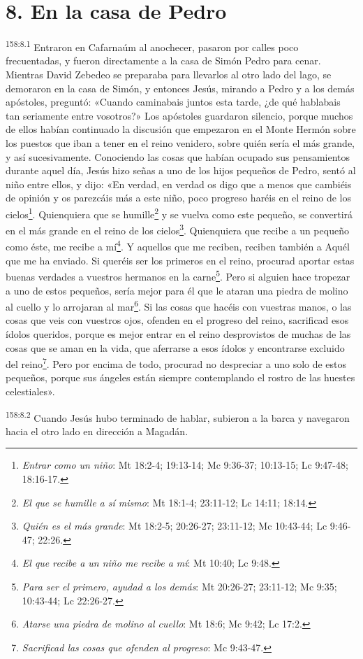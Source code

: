 \section*{8. En la casa de Pedro}
\par
\textsuperscript{158:8.1} Entraron en Cafarnaúm al anochecer, pasaron por calles poco frecuentadas, y fueron directamente a la casa de Simón Pedro para cenar. Mientras David Zebedeo se preparaba para llevarlos al otro lado del lago, se demoraron en la casa de Simón, y entonces Jesús, mirando a Pedro y a los demás apóstoles, preguntó: «Cuando caminabais juntos esta tarde, ¿de qué hablabais tan seriamente entre vosotros?» Los apóstoles guardaron silencio, porque muchos de ellos habían continuado la discusión que empezaron en el Monte Hermón sobre los puestos que iban a tener en el reino venidero, sobre quién sería el más grande, y así sucesivamente. Conociendo las cosas que habían ocupado sus pensamientos durante aquel día, Jesús hizo señas a uno de los hijos pequeños de Pedro, sentó al niño entre ellos, y dijo: «En verdad, en verdad os digo que a menos que cambiéis de opinión y os parezcáis más a este niño, poco progreso haréis en el reino de los cielos\footnote{\textit{Entrar como un niño}: Mt 18:2-4; 19:13-14; Mc 9:36-37; 10:13-15; Lc 9:47-48; 18:16-17.}. Quienquiera que se humille\footnote{\textit{El que se humille a sí mismo}: Mt 18:1-4; 23:11-12; Lc 14:11; 18:14.} y se vuelva como este pequeño, se convertirá en el más grande en el reino de los cielos\footnote{\textit{Quién es el más grande}: Mt 18:2-5; 20:26-27; 23:11-12; Mc 10:43-44; Lc 9:46-47; 22:26.}. Quienquiera que recibe a un pequeño como éste, me recibe a mí\footnote{\textit{El que recibe a un niño me recibe a mí}: Mt 10:40; Lc 9:48.}. Y aquellos que me reciben, reciben también a Aquél que me ha enviado. Si queréis ser los primeros en el reino, procurad aportar estas buenas verdades a vuestros hermanos en la carne\footnote{\textit{Para ser el primero, ayudad a los demás}: Mt 20:26-27; 23:11-12; Mc 9:35; 10:43-44; Lc 22:26-27.}. Pero si alguien hace tropezar a uno de estos pequeños, sería mejor para él que le ataran una piedra de molino al cuello y lo arrojaran al mar\footnote{\textit{Atarse una piedra de molino al cuello}: Mt 18:6; Mc 9:42; Lc 17:2.}. Si las cosas que hacéis con vuestras manos, o las cosas que veis con vuestros ojos, ofenden en el progreso del reino, sacrificad esos ídolos queridos, porque es mejor entrar en el reino desprovistos de muchas de las cosas que se aman en la vida, que aferrarse a esos ídolos y encontrarse excluido del reino\footnote{\textit{Sacrificad las cosas que ofenden al progreso}: Mc 9:43-47.}. Pero por encima de todo, procurad no despreciar a uno solo de estos pequeños, porque sus ángeles están siempre contemplando el rostro de las huestes celestiales».

\par
\textsuperscript{158:8.2} Cuando Jesús hubo terminado de hablar, subieron a la barca y navegaron hacia el otro lado en dirección a Magadán.